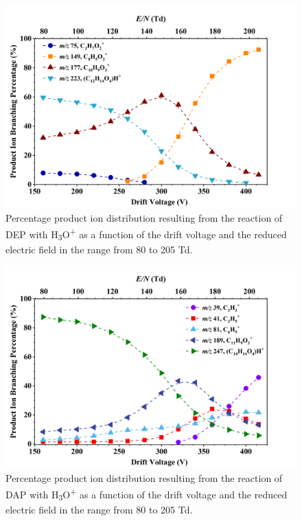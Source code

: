 \begin{figure}
\centering
\includegraphics[height=0.4\textheight]{pics/DEP-BR.png}
\caption{Percentage product ion distribution resulting from the reaction of DEP with H\textsubscript{3}O\textsuperscript{+} as a function of the drift voltage and the reduced electric field in the range from 80 to 205 Td.}
\label{fig:DEP_fs}
\end{figure}


\begin{figure}
\centering
\includegraphics[height=0.4\textheight]{pics/DAP-BR.png}
\caption{Percentage product ion distribution resulting from the reaction of DAP with H\textsubscript{3}O\textsuperscript{+} as a function of the drift voltage and the reduced electric field in the range from 80 to 205 Td.}
\label{fig:DAP_fs}
\end{figure}


